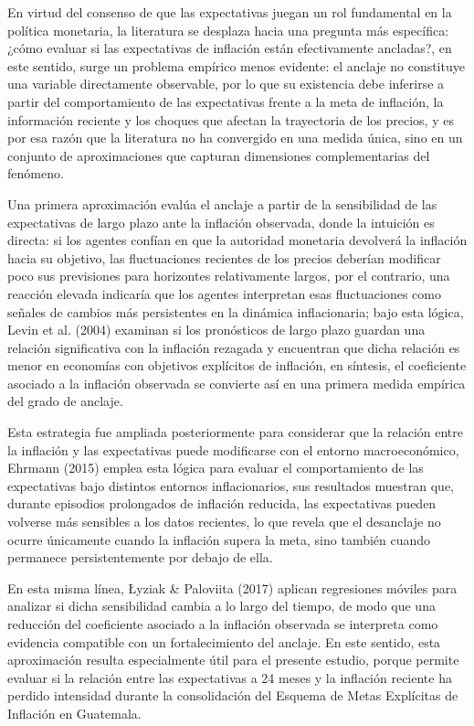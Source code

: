 \documentclass[
  10.5pt,
  letterpaper,
  twocolumn]{article}
\begin{document}
En virtud del consenso de que las expectativas juegan un rol fundamental
en la política monetaria, la literatura se desplaza hacia una pregunta
más específica: ¿cómo evaluar si las expectativas de inflación están
efectivamente ancladas?, en este sentido, surge un problema empírico
menos evidente: el anclaje no constituye una variable directamente
observable, por lo que su existencia debe inferirse a partir del
comportamiento de las expectativas frente a la meta de inflación, la
información reciente y los choques que afectan la trayectoria de los
precios, y es por esa razón que la literatura no ha convergido en una
medida única, sino en un conjunto de aproximaciones que capturan
dimensiones complementarias del fenómeno.

Una primera aproximación evalúa el anclaje a partir de la sensibilidad
de las expectativas de largo plazo ante la inflación observada, donde la
intuición es directa: si los agentes confían en que la autoridad
monetaria devolverá la inflación hacia su objetivo, las fluctuaciones
recientes de los precios deberían modificar poco sus previsiones para
horizontes relativamente largos, por el contrario, una reacción elevada
indicaría que los agentes interpretan esas fluctuaciones como señales de
cambios más persistentes en la dinámica inflacionaria; bajo esta lógica,
Levin et al. (2004) examinan si los pronósticos de largo plazo guardan
una relación significativa con la inflación rezagada y encuentran que
dicha relación es menor en economías con objetivos explícitos de
inflación, en síntesis, el coeficiente asociado a la inflación observada
se convierte así en una primera medida empírica del grado de anclaje.

Esta estrategia fue ampliada posteriormente para considerar que la
relación entre la inflación y las expectativas puede modificarse con el
entorno macroeconómico, Ehrmann (2015) emplea esta lógica para evaluar
el comportamiento de las expectativas bajo distintos entornos
inflacionarios, sus resultados muestran que, durante episodios
prolongados de inflación reducida, las expectativas pueden volverse más
sensibles a los datos recientes, lo que revela que el desanclaje no
ocurre únicamente cuando la inflación supera la meta, sino también
cuando permanece persistentemente por debajo de ella.

En esta misma línea, Łyziak \& Paloviita (2017) aplican regresiones
móviles para analizar si dicha sensibilidad cambia a lo largo del
tiempo, de modo que una reducción del coeficiente asociado a la
inflación observada se interpreta como evidencia compatible con un
fortalecimiento del anclaje. En este sentido, esta aproximación resulta
especialmente útil para el presente estudio, porque permite evaluar si
la relación entre las expectativas a 24 meses y la inflación reciente ha
perdido intensidad durante la consolidación del Esquema de Metas
Explícitas de Inflación en Guatemala.
\end{document}
